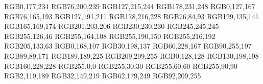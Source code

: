 \usepackage{xcolor}									%
\usepackage{color} 									%

\definecolor{blue1}		{RGB}{0,177,234}				%
\definecolor{blue2}		{RGB}{76,200,239}				%
\definecolor{blue3}		{RGB}{127,215,244}				%
\definecolor{blue4}		{RGB}{178,231,248}				%
\definecolor{bluegray1}	{RGB}{0,127,167}				%
\definecolor{bluegray2}	{RGB}{76,165,193}				%
\definecolor{bluegray3}	{RGB}{127,191,211}				%
\definecolor{bluegray4}	{RGB}{178,216,228}				%
\definecolor{gray1}		{RGB}{76,84,93}				%
\definecolor{gray2}		{RGB}{129,135,141}				%
\definecolor{gray3}		{RGB}{165,169,174}				%
\definecolor{gray4}		{RGB}{201,203,206}				%
\definecolor{gray5}		{RGB}{230,230,230}				%
\definecolor{gray6}		{RGB}{245,245,245}				%
\definecolor{orange1}	{RGB}{255,126,46}				%
\definecolor{orange2}	{RGB}{255,164,108}				%
\definecolor{orange3}	{RGB}{255,190,150}				%
\definecolor{orange4}	{RGB}{255,216,192}				%
\definecolor{brown1}		{RGB}{205,133,63}				%
\definecolor{green1}		{RGB}{0,168,107}				%
\definecolor{green2}		{RGB}{30,198,137}				%
\definecolor{green3}		{RGB}{60,228,167}				%
\definecolor{green4}		{RGB}{90,255,197}				%
\definecolor{purple1}		{RGB}{89,89,171}				%
\definecolor{purple3}		{RGB}{189,189,225}				%
\definecolor{purple4}		{RGB}{209,209,255}				%
\definecolor{teal1}		{RGB}{0,128,128}				%
\definecolor{teal3}		{RGB}{130,198,198}				%
\definecolor{teal4}		{RGB}{160,228,228}				%
\definecolor{red1}		{RGB}{255,0,0}					%
\definecolor{red2}		{RGB}{255,30,30}				%
\definecolor{red3}		{RGB}{255,60,60}				%
\definecolor{red4}		{RGB}{255,90,90}				%
\definecolor{royal1}		{RGB}{2,119,189}				%
\definecolor{royal2}		{RGB}{32,149,219}				%
\definecolor{royal3}		{RGB}{62,179,249}				%
\definecolor{royal4}		{RGB}{92,209,255}				%

\def\smallopacity	{0.7}								%
\def\bigopacity		{0.5}								%
\def\verybigopacity	{0.3}								%

\newcommand{\tikzscaleforoneplot}		{1.0}						%
\newcommand{\tikzscalefortwoplots}		{0.8}						%
\newcommand{\tikzscaleforthreeplots}	{0.675}					%
\newcommand{\tikzwidthforoneplot}		{.65\textwidth}				%
\newcommand{\tikzheightforoneplot}		{.4\textwidth}				%
\tikzset{font=\small}											%


